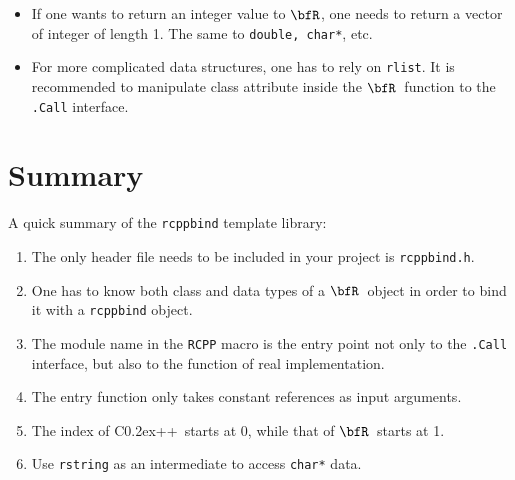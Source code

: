 \documentclass{article}
\def\C++{C{\raise 0.2ex\hbox{++}}}
\newcommand{\R}{$\bfR$}
\begin{document}
\begin{itemize}
  \item If one wants to return an integer value to \R, one
    needs to return a vector of integer of length 1.  The
    same to \texttt{double, char*}, etc.
  \item For more complicated data structures, one has to rely
    on \texttt{rlist}. It is recommended to manipulate class
    attribute inside the \R\ function to the \texttt{.Call}
    interface.
\end{itemize}

\section{Summary}\label{sec:summary}

A quick summary of the \texttt{rcppbind} template library:
\begin{enumerate}
  \item The only header file needs to be included in your
    project is \texttt{rcppbind.h}.
  \item One has to know both class and data types of a \R\
    object in order to bind it with a \texttt{rcppbind}
    object.
  \item The module name in the \texttt{RCPP} macro is the
    entry point not only to the \texttt{.Call} interface,
    but also to the function of real implementation.
  \item The entry function only takes constant
    references as
    input arguments.
  \item The index of \C++\ starts at 0, while that of \R\
    starts at 1.
  \item Use \texttt{rstring} as an intermediate to access
    \texttt{char*} data.
\end{enumerate}
\end{document}
